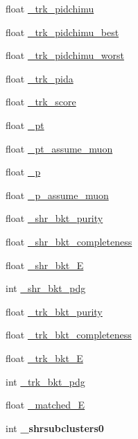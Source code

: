 \begin{DoxyCompactItemize}
float \hyperlink{classselection_1_1CC0piNpSelection_a74ddf5622f3ee32110e9342361020a89}{\+\_\+trk\+\_\+pidchimu}
\item 
float \hyperlink{classselection_1_1CC0piNpSelection_a04216d0564f79f3c4a267130cd70e753}{\+\_\+trk\+\_\+pidchimu\+\_\+best}
\item 
float \hyperlink{classselection_1_1CC0piNpSelection_a9e88e0ae759d19106d964c13926fba4b}{\+\_\+trk\+\_\+pidchimu\+\_\+worst}
\item 
float \hyperlink{classselection_1_1CC0piNpSelection_af0fe49227e33b3f46015a821de58ba1f}{\+\_\+trk\+\_\+pida}
\item 
float \hyperlink{classselection_1_1CC0piNpSelection_a72517a224dc19f95faef3efde9a999d1}{\+\_\+trk\+\_\+score}
\item 
float \hyperlink{classselection_1_1CC0piNpSelection_a98281b58b33ff8c03fa9b00f3f3baa06}{\+\_\+pt}
\item 
float \hyperlink{classselection_1_1CC0piNpSelection_a4213e006ba267c2ff55415cc9ef07bf8}{\+\_\+pt\+\_\+assume\+\_\+muon}
\item 
float \hyperlink{classselection_1_1CC0piNpSelection_afae64b232d6b3526032b289c91b092cb}{\+\_\+p}
\item 
float \hyperlink{classselection_1_1CC0piNpSelection_a2e861bf5b394c18e24f58d9fef5c33a5}{\+\_\+p\+\_\+assume\+\_\+muon}
\item 
float \hyperlink{classselection_1_1CC0piNpSelection_a1da68886d5b7a5b4eb1785649c48e8ef}{\+\_\+shr\+\_\+bkt\+\_\+purity}
\item 
float \hyperlink{classselection_1_1CC0piNpSelection_ac3c3c9895ca501c3b73f14addfddf495}{\+\_\+shr\+\_\+bkt\+\_\+completeness}
\item 
float \hyperlink{classselection_1_1CC0piNpSelection_aa1a21f48d99a4de5f1d444aa3d64dedf}{\+\_\+shr\+\_\+bkt\+\_\+E}
\item 
int \hyperlink{classselection_1_1CC0piNpSelection_aab09f93d7cd57031de714956414f3230}{\+\_\+shr\+\_\+bkt\+\_\+pdg}
\item 
float \hyperlink{classselection_1_1CC0piNpSelection_a39a84b873306f200a2350b4804429791}{\+\_\+trk\+\_\+bkt\+\_\+purity}
\item 
float \hyperlink{classselection_1_1CC0piNpSelection_aab22ce289e2d4a109440369e30fddf52}{\+\_\+trk\+\_\+bkt\+\_\+completeness}
\item 
float \hyperlink{classselection_1_1CC0piNpSelection_aa7a6076f1169185e0b2b02fbb03aba22}{\+\_\+trk\+\_\+bkt\+\_\+E}
\item 
int \hyperlink{classselection_1_1CC0piNpSelection_a7044de37ee4f3615ffe4bb15e9f00f8e}{\+\_\+trk\+\_\+bkt\+\_\+pdg}
\item 
float \hyperlink{classselection_1_1CC0piNpSelection_ac75aa3ac33061bbdd378594ee7e6e2e5}{\+\_\+matched\+\_\+E}
\item 
int {\bfseries \+\_\+shrsubclusters0}\hypertarget{classselection_1_1CC0piNpSelection_a670d3708a1060017b414acd416c02b5c}{}\label{classselection_1_1CC0piNpSelection_a670d3708a1060017b414acd416c02b5c}


\end{DoxyCompactItemize}
